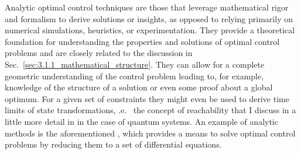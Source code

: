 Analytic optimal control techniques are those that leverage mathematical rigor and formalism to derive solutions or insights, as opposed to relying primarily on numerical simulations, heuristics, or experimentation. They provide a theoretical foundation for understanding the properties and solutions of optimal control problems and are closely related to the discussion in Sec.~\ref{sec:3.1.1_mathematical_structure}. They can allow for a complete geometric understanding of the control problem leading to, for example, knowledge of the structure of a solution or even some proof about a global optimum. For a given set of constraints they might even be used to derive time limits of state transformations, \@i.e.~ the concept of reachability that I discuss in a little more detail in  in the case of quantum systems. An example of analytic methods is the aforementioned , which provides a means to solve optimal control problems by reducing them to a set of differential equations.

